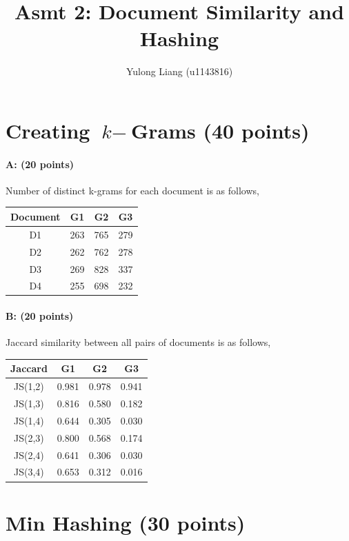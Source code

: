 \documentclass[11pt]{article}
\title{Asmt 2: Document Similarity and Hashing}
\author{Yulong Liang (u1143816)}
\begin{document}
\maketitle

\section{Creating $\textit{k}-$Grams (40 points)}

\paragraph{A: (20 points)}
Number of distinct k-grams for each document is as follows,
\begin{table}[h]
\centering
\begin{tabular}{c|c|c|c}
Document & G1 & G2 & G3\\
\hline
D1 & 263 & 765 & 279\\
D2 & 262 & 762 & 278\\
D3 & 269 & 828 & 337\\
D4 & 255 & 698 & 232\\
\end{tabular}
\end{table}

\paragraph{B: (20 points)}
Jaccard similarity between all pairs of documents is as follows,
\begin{table}[h]
\centering
\begin{tabular}{c|c|c|c}
Jaccard & G1 & G2 & G3\\
\hline
JS(1,2) & 0.981 & 0.978 & 0.941 \\
JS(1,3) & 0.816 & 0.580 & 0.182 \\
JS(1,4) & 0.644 & 0.305 & 0.030 \\
JS(2,3) & 0.800 & 0.568 & 0.174 \\
JS(2,4) & 0.641 & 0.306 & 0.030 \\
JS(3,4) & 0.653 & 0.312 & 0.016 \\
\end{tabular}
\end{table}

\section{Min Hashing (30 points)}
\end{document}
